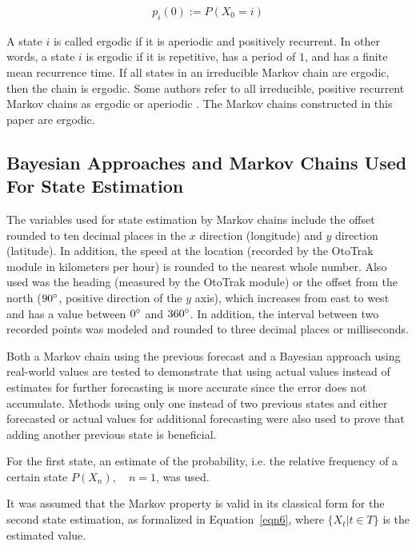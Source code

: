 \documentclass[preprint,12pt]{elsarticle}
\begin{document}
\begin{equation} \label{eqn5}
    \begin{aligned}
     p_{i}(0):=P(X_{0}=i)
    \end{aligned}
\end{equation}  

A state $i$ is called ergodic if it is aperiodic and positively recurrent. In other words, a state $i$ is ergodic if it is repetitive, has a period of $1$, and has a finite mean recurrence time. If all states in an irreducible Markov chain are ergodic, then the chain is ergodic. Some authors refer to all irreducible, positive recurrent Markov chains as ergodic or aperiodic \citep{Parzen1962-oe}. The Markov chains constructed in this paper are ergodic.

\subsection{Bayesian Approaches and Markov Chains Used For State Estimation}

The variables used for state estimation by Markov chains include the offset rounded to ten decimal places in the $x$ direction (longitude) and $y$ direction (latitude). In addition, the speed at the location (recorded by the OtoTrak module in kilometers per hour) is rounded to the nearest whole number. Also used was the heading (measured by the OtoTrak module) or the offset from the north ($90\degree$, positive direction of the $y$ axis), which increases from east to west and has a value between $0\degree$ and $360\degree$. In addition, the interval between two recorded points was modeled and rounded to three decimal places or milliseconds.

Both a Markov chain using the previous forecast and a Bayesian approach using real-world values are tested to demonstrate that using actual values instead of estimates for further forecasting is more accurate since the error does not accumulate. Methods using only one instead of two previous states and either forecasted or actual values for additional forecasting were also used to prove that adding another previous state is beneficial.

For the first state, an estimate of the probability, i.e. the relative frequency of a certain state $P(X_{n}), \quad n = 1$, was used.

It was assumed that the Markov property is valid in its classical form for the second state estimation, as formalized in Equation~\ref{eqn6}, where $\{X_{t}|t\in T\}$ is the estimated value.
\end{document}

